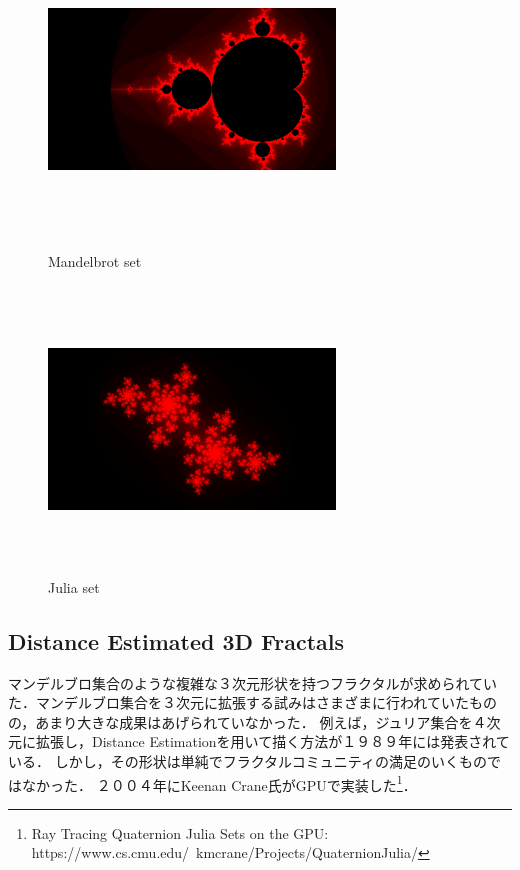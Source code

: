\begin{figure}[htbp]
 \begin{minipage}{0.49\hsize}
  \begin{center}
   \includegraphics[width=3in, height=3in, keepaspectratio]{../img/fractal/mandelbrot.pdf}
   \caption{Mandelbrot set}
   \label{fig:mandelbrot}
  \end{center}
 \end{minipage}
 \begin{minipage}{0.49\hsize}
     \includegraphics[width=3in, height=3in, keepaspectratio]{../img/fractal/julia.pdf}
   \caption{Julia set}
   \label{fig:julia}
 \end{minipage}
\end{figure}

\subsection{Distance Estimated 3D Fractals}

マンデルブロ集合のような複雑な３次元形状を持つフラクタルが求められていた．マンデルブロ集合を３次元に拡張する試みはさまざまに行われていたものの，あまり大きな成果はあげられていなかった．
例えば，ジュリア集合を４次元に拡張し，Distance Estimationを用いて描く方法が１９８９年には発表されている\cite{4djulia}．
しかし，その形状は単純でフラクタルコミュニティの満足のいくものではなかった．
２００４年にKeenan Crane氏がGPUで実装した\footnote{Ray Tracing Quaternion Julia Sets on the GPU: https://www.cs.cmu.edu/~kmcrane/Projects/QuaternionJulia/}．

